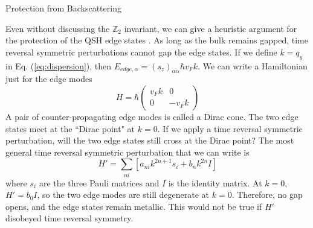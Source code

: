 \documentclass[a4paper,12pt]{article}
\begin{document}
\begin{section}{Protection from Backscattering}

Even without discussing the $\mathbb{Z}_2$ invariant, we can give a heuristic argument for the protection of the QSH edge states \cite{sun_kai}.  As long as the bulk remains gapped, time reversal symmetric perturbations cannot gap the edge states.  If we define $k=q_y$ in Eq. (\ref{eq:dispersion}), then $E_{edge, \alpha} = (s_z)_{\alpha \alpha} \hbar v_F k$.  We can write a Hamiltonian just for the edge modes
\begin{equation}
H=\hbar \left(
\begin{array}{cc}
v_F k & 0  \\
0 & -v_F k
\end{array}
\right)
\end{equation}
A pair of counter-propagating edge modes is called a Dirac cone.  The two edge states meet at the ``Dirac point" at $k=0$.  If we apply a time reversal symmetric perturbation, will the two edge states still cross at the Dirac point?  The most general time reversal symmetric perturbation that we can write is
\begin{equation}
H'=\sum_{ni} \left[ a_{ni} k^{2n+1} s_i + b_n k^{2n} I  \right]
\end{equation}
where $s_i$ are the three Pauli matrices and $I$ is the identity matrix.  At $k=0$, $H'=b_0 I$, so the two edge modes are still degenerate at $k=0$.  Therefore, no gap opens, and the edge states remain metallic.  This would not be true if $H'$ disobeyed time reversal symmetry.


\end{section}
\end{document}
